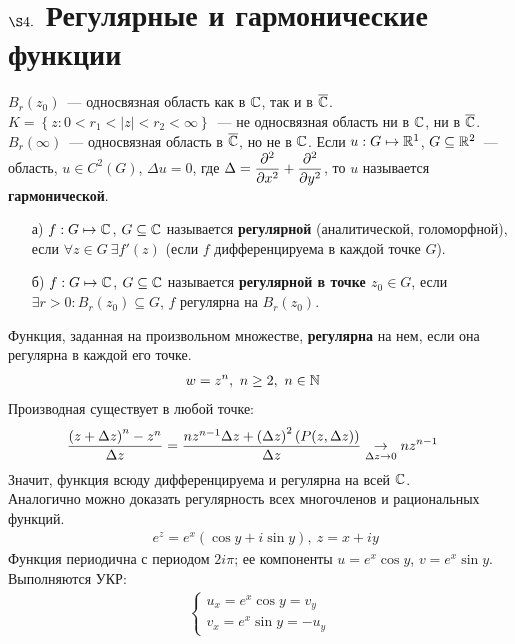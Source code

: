 \section{$\S 4.$ Регулярные и гармонические функции}
\example
$B_r(z_0)$~--- односвязная область как в $\mathbb{C}$, так и в $\overline{\mathbb{C}}$.
\example
$K = \left\{ z: 0 < r_1 < \left| z \right| < r_2 < \infty \right\}$~--- не
односвязная область ни в $\mathbb{C}$, ни в $\overline{\mathbb{C}}$.
\example
$B_r(\infty)$~--- односвязная область в $\overline{\mathbb{C}}$, но не в $\mathbb{C}$.
\Def
Если $u:G \mapsto \mathbb{R}^1$, $G \subseteq \mathbb{R}^2$~--- область, $u \in C^2(G)$,
$\Delta u = 0$, где $\Delta = \displaystyle \frac{\partial^2}{\partial x^2} + \displaystyle
\frac{\partial^2}{\partial y^2}$, то $u$ называется \textbf{гармонической}.
\Def ~
\begin{itemize}
    \item[а)]$f: G \mapsto \mathbb{C}$, $G \subseteq \mathbb{C}$ называется
    \textbf{регулярной} (аналитической, голоморфной), если $\forall z \in G
    \ \exists f'(z)$ (если $f$ дифференцируема в каждой точке $G$).
    \item[б)]$f: G \mapsto \mathbb{C}$, $G \subseteq \mathbb{C}$ называется
    \textbf{регулярной в точке $z_0 \in G$}, если $\exists r > 0: B_r(z_0)
    \subseteq G$, $f$ регулярна на $B_r(z_0)$.
\end{itemize}
\Def
Функция, заданная на произвольном множестве, \textbf{регулярна} на нем, если она
регулярна в каждой его точке.
\Example
\begin{align*}
  & w = z^n, \ n \geq 2, \ n \in \mathbb{N}
\end{align*}
Производная существует в любой точке:
\begin{align*}
  & \frac{\left( z+\Delta z \right)^n - z^n}{\Delta z} = \frac{nz^{n-1}\Delta z + \left( \Delta z \right)^2\left( P(z, \Delta z) \right)}{\Delta z} \underset{\Delta z \to 0}{\to} nz^{n-1}
\end{align*}
Значит, функция всюду дифференцируема и регулярна на всей $\mathbb{C}$.
\\
Аналогично можно доказать регулярность всех многочленов и рациональных функций.
\Def
\begin{align*}
  & e^z = e^x\left( \cos y + i \sin y \right), \ z = x+iy
\end{align*}
Функция периодична с периодом $2 i \pi$; ее компоненты $u = e^x \cos y$, $v =
e^x \sin y$.
Выполняются УКР:
\begin{align*}
  & \begin{cases}
      u_x = e^x \cos y = v_y \\
      v_x = e^x \sin y = -u_y
  \end{cases}
  & %
\end{align*}
